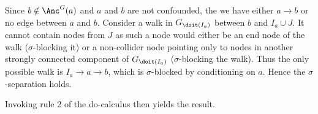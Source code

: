 \begin{enumerate}
\begin{gradedsolution}
\begin{enumerate}
	Since $b \notin \Anc^G(a)$ and $a$ and $b$ are not confounded, the we have either $a \to b$ or no edge between $a$ and $b$. Consider a walk in $G_{\doit(I_a)}$ between $b$ and $I_a \cup J$. It cannot contain nodes from $J$ as such a node would either be an end node of the walk ($\sigma$-blocking it) or a non-collider node pointing only to nodes in another strongly connected component of $G_{\doit(I_a)}$
	($\sigma$-blocking the walk). Thus the only possible walk is $I_a \to a \to b$, which is $\sigma$-blocked by conditioning on $a$. Hence the $\sigma$-separation holds.

	Invoking rule 2 of the do-calculus then yields the result.
\end{enumerate}
\end{gradedsolution}

\end{enumerate}

